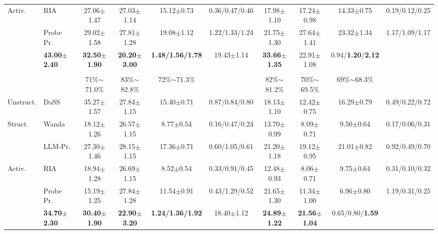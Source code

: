\documentclass[12pt,a4paper]{article}
\newcommand{\method}[1]{{\sffamily\bfseries\color{MethodBlue}#1}}
\newcommand{\XDB}{\method{XDomainBench}}
\newcommand{\SubspacePath}{\method{SubspacePath Pruner}}
\def\method#1{#1}\def\XDB{XDomainBench}\def\SubspacePath{SubspacePath Pruner}%
\begin{document}
\begin{table}[t]
\begin{adjustbox}{max width=\textwidth}
\begin{tabular}{llccc c ccc c}
\multirow{2}{*}{Activ.} & RIA &
27.06{\scriptsize$\pm$1.47} & 27.03{\scriptsize$\pm$1.14} & 15.12{\scriptsize$\pm$0.73} &
0.36/0.47/0.46 &
17.98{\scriptsize$\pm$1.10} & 17.24{\scriptsize$\pm$0.98} & 14.33{\scriptsize$\pm$0.75} &
0.19/0.12/0.25\\
& Probe Pr. &
29.02{\scriptsize$\pm$1.58} & 27.81{\scriptsize$\pm$1.28} & 19.08{\scriptsize$\pm$1.12} &
1.22/1.33/1.24 &
21.75{\scriptsize$\pm$1.30} & 27.64{\scriptsize$\pm$1.41} & 23.32{\scriptsize$\pm$1.34} &
1.17/1.09/1.17\\
\rowcolor{SoftBlue}\multicolumn{2}{l}{\textbf{\SubspacePath{}}} &
\textbf{43.00{\scriptsize$\pm$2.40}} & \textbf{32.50{\scriptsize$\pm$1.90}} & \textbf{20.20{\scriptsize$\pm$3.00}} &
\textbf{1.48/1.56/1.78} &
19.43{\scriptsize$\pm$1.14} & \textbf{33.66{\scriptsize$\pm$1.35}} & 22.91{\scriptsize$\pm$1.08} &
0.94/\textbf{1.20}/\textbf{2.12}\\
\midrule
\rowcolor{SoftGray}\multicolumn{10}{c}{\textbf{Aggressive pruning}}\\
\rowcolor{SoftGray}&&
71\%$\sim$71.0\% & 83\%$\sim$82.8\% & 72\%$\sim$71.3\% &&
82\%$\sim$81.2\% & 70\%$\sim$69.5\% & 69\%$\sim$68.3\% &\\
\multirow{1}{*}{Unstruct.} & DaSS &
35.27{\scriptsize$\pm$1.57} & 27.84{\scriptsize$\pm$1.15} & 15.40{\scriptsize$\pm$0.71} &
0.87/0.84/0.80 &
18.13{\scriptsize$\pm$1.10} & 12.42{\scriptsize$\pm$0.75} & 16.29{\scriptsize$\pm$0.79} &
0.49/0.22/0.72\\
\multirow{2}{*}{Struct.} & Wanda &
18.12{\scriptsize$\pm$1.26} & 26.57{\scriptsize$\pm$1.15} & 8.77{\scriptsize$\pm$0.54} &
0.16/0.47/0.24 &
13.70{\scriptsize$\pm$0.99} & 8.09{\scriptsize$\pm$0.71} & 9.50{\scriptsize$\pm$0.64} &
0.17/0.06/0.31\\
& LLM-Pr. &
27.30{\scriptsize$\pm$1.46} & 28.15{\scriptsize$\pm$1.15} & 17.36{\scriptsize$\pm$0.71} &
0.60/1.05/0.61 &
21.20{\scriptsize$\pm$1.18} & 19.12{\scriptsize$\pm$0.95} & 21.01{\scriptsize$\pm$0.82} &
0.92/0.49/0.70\\
\multirow{2}{*}{Activ.} & RIA &
18.94{\scriptsize$\pm$1.28} & 26.69{\scriptsize$\pm$1.15} & 8.52{\scriptsize$\pm$0.54} &
0.33/0.91/0.45 &
12.48{\scriptsize$\pm$0.93} & 8.06{\scriptsize$\pm$0.71} & 9.75{\scriptsize$\pm$0.64} &
0.31/0.10/0.32\\
& Probe Pr. &
15.19{\scriptsize$\pm$1.25} & 27.84{\scriptsize$\pm$1.28} & 11.54{\scriptsize$\pm$0.91} &
0.43/1.29/0.52 &
21.65{\scriptsize$\pm$1.30} & 11.34{\scriptsize$\pm$1.00} & 6.96{\scriptsize$\pm$0.80} &
1.19/0.31/0.25\\
\rowcolor{SoftBlue}\multicolumn{2}{l}{\textbf{\SubspacePath{}}} &
\textbf{34.70{\scriptsize$\pm$2.30}} & \textbf{30.40{\scriptsize$\pm$1.90}} & \textbf{22.90{\scriptsize$\pm$3.20}} &
\textbf{1.24/1.36/1.92} &
18.40{\scriptsize$\pm$1.12} & \textbf{24.89{\scriptsize$\pm$1.22}} & \textbf{21.56{\scriptsize$\pm$1.04}} &
0.65/0.80/\textbf{1.59}\\
\bottomrule
\end{tabular}
\end{adjustbox}
\end{table}
\end{document}
